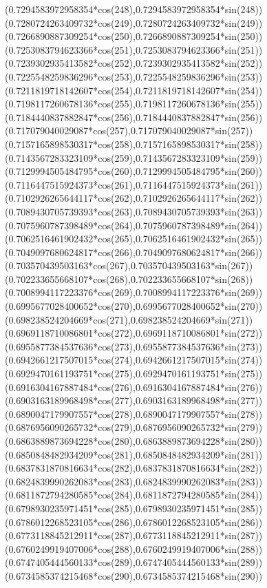 {({0.7294583972958354*cos(248)},{0.7294583972958354*sin(248)})
({0.7280724263409732*cos(249)},{0.7280724263409732*sin(249)})
({0.7266890887309254*cos(250)},{0.7266890887309254*sin(250)})
({0.7253083794623366*cos(251)},{0.7253083794623366*sin(251)})
({0.7239302935413582*cos(252)},{0.7239302935413582*sin(252)})
({0.7225548259836296*cos(253)},{0.7225548259836296*sin(253)})
({0.7211819718142607*cos(254)},{0.7211819718142607*sin(254)})
({0.7198117260678136*cos(255)},{0.7198117260678136*sin(255)})
({0.7184440837882847*cos(256)},{0.7184440837882847*sin(256)})
({0.717079040029087*cos(257)},{0.717079040029087*sin(257)})
({0.7157165898530317*cos(258)},{0.7157165898530317*sin(258)})
({0.7143567283323109*cos(259)},{0.7143567283323109*sin(259)})
({0.7129994505484795*cos(260)},{0.7129994505484795*sin(260)})
({0.7116447515924373*cos(261)},{0.7116447515924373*sin(261)})
({0.7102926265644117*cos(262)},{0.7102926265644117*sin(262)})
({0.7089430705739393*cos(263)},{0.7089430705739393*sin(263)})
({0.7075960787398489*cos(264)},{0.7075960787398489*sin(264)})
({0.7062516461902432*cos(265)},{0.7062516461902432*sin(265)})
({0.7049097680624817*cos(266)},{0.7049097680624817*sin(266)})
({0.703570439503163*cos(267)},{0.703570439503163*sin(267)})
({0.702233655668107*cos(268)},{0.702233655668107*sin(268)})
({0.7008994117223376*cos(269)},{0.7008994117223376*sin(269)})
({0.6995677028400652*cos(270)},{0.6995677028400652*sin(270)})
({0.698238524204669*cos(271)},{0.698238524204669*sin(271)})
({0.6969118710086801*cos(272)},{0.6969118710086801*sin(272)})
({0.6955877384537636*cos(273)},{0.6955877384537636*sin(273)})
({0.6942661217507015*cos(274)},{0.6942661217507015*sin(274)})
({0.6929470161193751*cos(275)},{0.6929470161193751*sin(275)})
({0.6916304167887484*cos(276)},{0.6916304167887484*sin(276)})
({0.6903163189968498*cos(277)},{0.6903163189968498*sin(277)})
({0.6890047179907557*cos(278)},{0.6890047179907557*sin(278)})
({0.6876956090265732*cos(279)},{0.6876956090265732*sin(279)})
({0.6863889873694228*cos(280)},{0.6863889873694228*sin(280)})
({0.6850848482934209*cos(281)},{0.6850848482934209*sin(281)})
({0.6837831870816634*cos(282)},{0.6837831870816634*sin(282)})
({0.6824839990262083*cos(283)},{0.6824839990262083*sin(283)})
({0.6811872794280585*cos(284)},{0.6811872794280585*sin(284)})
({0.6798930235971451*cos(285)},{0.6798930235971451*sin(285)})
({0.6786012268523105*cos(286)},{0.6786012268523105*sin(286)})
({0.6773118845212911*cos(287)},{0.6773118845212911*sin(287)})
({0.6760249919407006*cos(288)},{0.6760249919407006*sin(288)})
({0.6747405444560133*cos(289)},{0.6747405444560133*sin(289)})
({0.6734585374215468*cos(290)},{0.6734585374215468*sin(290)})
}
